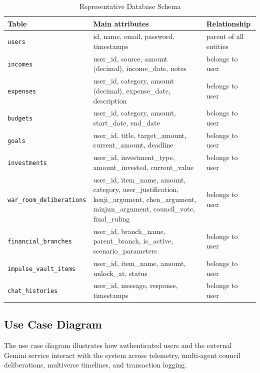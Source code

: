 \documentclass[12pt,a4paper]{report}
\begin{document}
\begin{table}[H]
\centering
\caption{Representative Database Schema}
\label{tab:schema}
\footnotesize
\renewcommand{\arraystretch}{1.2}
\begin{tabular}{|p{3.2cm}|p{7.2cm}|p{3.2cm}|}
\hline
\textbf{Table} & \textbf{Main attributes} & \textbf{Relationship} \\ \hline
\texttt{users} & id, name, email, password, timestamps & parent of all entities \\ \hline
\texttt{incomes} & user\_id, source, amount (decimal), income\_date, notes & belongs to user \\ \hline
\texttt{expenses} & user\_id, category, amount (decimal), expense\_date, description & belongs to user \\ \hline
\texttt{budgets} & user\_id, category, amount, start\_date, end\_date & belongs to user \\ \hline
\texttt{goals} & user\_id, title, target\_amount, current\_amount, deadline & belongs to user \\ \hline
\texttt{investments} & user\_id, investment\_type, amount\_invested, current\_value & belongs to user \\ \hline
\texttt{war\_room\_deliberations} & user\_id, item\_name, amount, category, user\_justification, kenji\_argument, chen\_argument, minjun\_argument, council\_vote, final\_ruling & belongs to user \\ \hline
\texttt{financial\_branches} & user\_id, branch\_name, parent\_branch, is\_active, scenario\_parameters & belongs to user \\ \hline
\texttt{impulse\_vault\_items} & user\_id, item\_name, amount, unlock\_at, status & belongs to user \\ \hline
\texttt{chat\_histories} & user\_id, message, response, timestamps & belongs to user \\ \hline
\end{tabular}
\end{table}


\subsection{Use Case Diagram}\label{s423}

The use case diagram illustrates how authenticated users and the external Gemini service interact with the system across telemetry, multi-agent council deliberations, multiverse timelines, and transaction logging.
\end{document}

